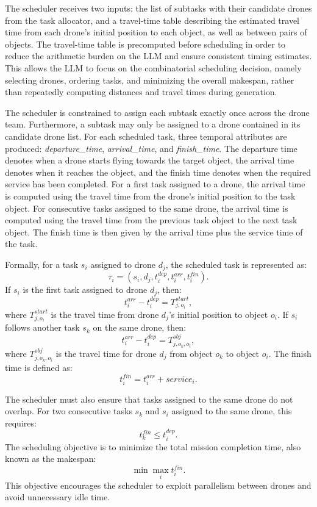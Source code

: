 The scheduler receives two inputs: the list of subtasks with their candidate drones from the task allocator, 
and a travel-time table describing the estimated travel time from each drone's initial position to each object, 
as well as between pairs of objects.
The travel-time table is precomputed before scheduling in order to reduce the arithmetic burden on the LLM and ensure consistent timing estimates.
This allows the LLM to focus on the combinatorial scheduling decision, namely selecting drones, ordering tasks, and minimizing the overall makespan,
rather than repeatedly computing distances and travel times during generation.

The scheduler is constrained to assign each subtask exactly once across the drone team.
Furthermore, a subtask may only be assigned to a drone contained in its candidate drone list.
For each scheduled task, three temporal attributes are produced: \textit{departure\_time}, \textit{arrival\_time}, and \textit{finish\_time}.
The departure time denotes when a drone starts flying towards the target object, the arrival time denotes when it reaches the object, 
and the finish time denotes when the required service has been completed.
For a first task assigned to a drone, the arrival time is computed using the travel time from the drone's initial position to the task object.
For consecutive tasks assigned to the same drone, 
the arrival time is computed using the travel time from the previous task object to the next task object.
The finish time is then given by the arrival time plus the service time of the task.

Formally, for a task \(s_i\) assigned to drone \(d_j\), the scheduled task is represented as:
\[
\tau_i = (s_i, d_j, t_i^{dep}, t_i^{arr}, t_i^{fin}).
\]
If \(s_i\) is the first task assigned to drone \(d_j\), then:
\[
t_i^{arr} - t_i^{dep} = T^{start}_{j,o_i},
\]
where \(T^{start}_{j,o_i}\) is the travel time from drone \(d_j\)'s initial position to object \(o_i\).
If \(s_i\) follows another task \(s_k\) on the same drone, then:
\[
t_i^{arr} - t_i^{dep} = T^{obj}_{j,o_k,o_i},
\]
where \(T^{obj}_{j,o_k,o_i}\) is the travel time for drone \(d_j\) from object \(o_k\) to object \(o_i\).
The finish time is defined as:
\[
t_i^{fin} = t_i^{arr} + service_i.
\]

The scheduler must also ensure that tasks assigned to the same drone do not overlap.
For two consecutive tasks \(s_k\) and \(s_i\) assigned to the same drone, this requires:
\[
t_k^{fin} \leq t_i^{dep}.
\]
The scheduling objective is to minimize the total mission completion time, also known as the makespan:
\[
\min \max_i t_i^{fin}.
\]
This objective encourages the scheduler to exploit parallelism between drones and avoid unnecessary idle time.

